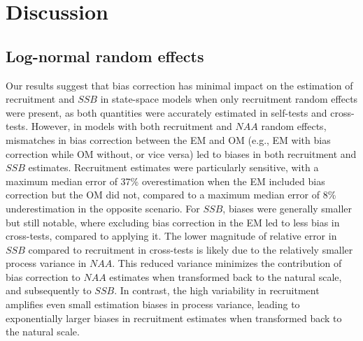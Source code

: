 \documentclass[
  12pt,
]{article}
\begin{document}
\section{Discussion}\label{discussion}

\subsection{Log-normal random effects}\label{log-normal-random-effects}

Our results suggest that bias correction has minimal impact on the
estimation of recruitment and \(SSB\) in state-space models when only
recruitment random effects were present, as both quantities were
accurately estimated in self-tests and cross-tests. However, in models
with both recruitment and \(NAA\) random effects, mismatches in bias
correction between the EM and OM (e.g., EM with bias correction while OM
without, or vice versa) led to biases in both recruitment and \(SSB\)
estimates. Recruitment estimates were particularly sensitive, with a
maximum median error of 37\% overestimation when the EM included bias
correction but the OM did not, compared to a maximum median error of 8\%
underestimation in the opposite scenario. For \(SSB\), biases were
generally smaller but still notable, where excluding bias correction in
the EM led to less bias in cross-tests, compared to applying it. The
lower magnitude of relative error in \(SSB\) compared to recruitment in
cross-tests is likely due to the relatively smaller process variance in
\(NAA\). This reduced variance minimizes the contribution of bias
correction to \(NAA\) estimates when transformed back to the natural
scale, and subsequently to \(SSB\). In contrast, the high variability in
recruitment amplifies even small estimation biases in process variance,
leading to exponentially larger biases in recruitment estimates when
transformed back to the natural scale.
\end{document}
